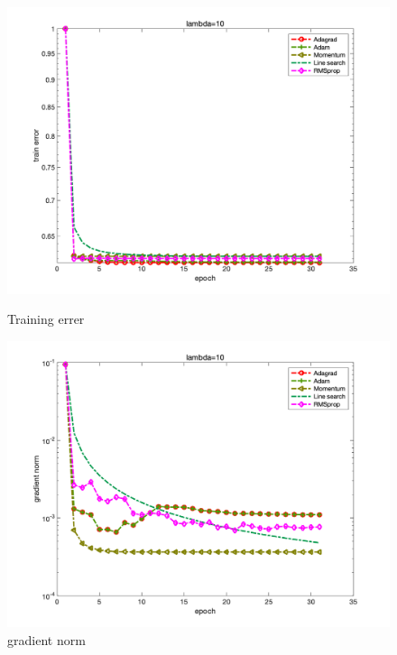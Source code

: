 \documentclass{article}
\begin{document}
\begin{figure}[H]
	\begin{minipage}{0.33\linewidth}
		\centering
		\includegraphics[width=1\linewidth]{./fig/fval_c1}
		\caption{Training errer}
	\end{minipage}
	\begin{minipage}{0.33\linewidth}
		\centering
		\includegraphics[width=1\linewidth]{./fig/gnorm_c1}
		\caption{gradient norm}
	\end{minipage}
	\begin{minipage}{0.33\linewidth}
		\centering

\end{minipage}
\end{figure}
\end{document}
